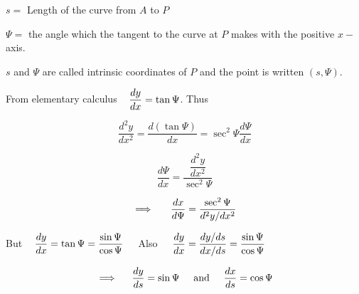 \documentclass[11pt,a4paper]{article}
\theoremstyle{definition}
\begin{document}
$s = $ Length of the curve from  $A$ to $P$


$\Psi = $ the angle which the tangent to the curve at $P$ makes with the positive $x -$ axis.


$s$ and $\Psi$ are called intrinsic coordinates of $P$ and the point is written $(s,\Psi)$.


From elementary calculus
$\hspace{0.3cm}\dfrac{dy}{dx} = \tan \Psi$. Thus

$$\frac{d^2y}{dx^2} = \frac{d(\tan \Psi)}{dx} = \sec^2\Psi \dfrac{d\Psi}{dx}$$

$$\frac{d\Psi}{dx}= \frac{\dfrac{d^2y}{dx^2}}{\sec^2\Psi}$$

$$\implies \hspace{0.5cm} \frac{dx}{d\Psi} = \frac{\sec^2 \Psi}{d^2y/dx^2}$$


But $\hspace{0.3cm}\displaystyle{\frac{dy}{dx} = \tan \Psi = \frac{\sin \Psi}{\cos \Psi}}\hspace{0.4cm}$
Also $\hspace{0.4cm}\displaystyle{\frac{dy}{dx} = \frac{dy/ds}{dx/ds} =\frac{\sin \Psi}{\cos \Psi}}$


$$\implies\hspace{0.4cm} \frac{dy}{ds} = \sin \Psi \hspace{0.5cm}\text{and}\hspace{0.5cm} \frac{dx}{ds} = \cos \Psi$$
\end{document}
